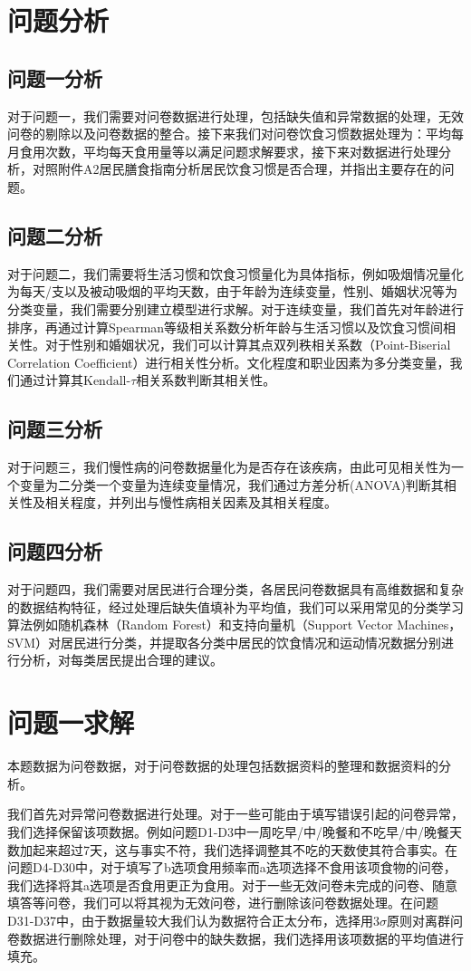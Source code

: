 \documentclass{cumcmthesis}
\begin{document}
\section{问题分析}

\subsection{问题一分析}
对于问题一，我们需要对问卷数据进行处理，包括缺失值和异常数据的处理，无效问卷的剔除以及问卷数据的整合。接下来我们对问卷饮食习惯数据处理为：平均每月食用次数，平均每天食用量等以满足问题求解要求，接下来对数据进行处理分析，对照附件A2居民膳食指南分析居民饮食习惯是否合理，并指出主要存在的问题。
\subsection{问题二分析}
对于问题二，我们需要将生活习惯和饮食习惯量化为具体指标，例如吸烟情况量化为每天/支以及被动吸烟的平均天数，由于年龄为连续变量，性别、婚姻状况等为分类变量，我们需要分别建立模型进行求解。对于连续变量，我们首先对年龄进行排序，再通过计算Spearman等级相关系数分析年龄与生活习惯以及饮食习惯间相关性。对于性别和婚姻状况，我们可以计算其点双列秩相关系数（Point-Biserial Correlation Coefficient）进行相关性分析。文化程度和职业因素为多分类变量，我们通过计算其$\text{Kendall-}\tau$相关系数判断其相关性。
\subsection{问题三分析}
对于问题三，我们慢性病的问卷数据量化为是否存在该疾病，由此可见相关性为一个变量为二分类一个变量为连续变量情况，我们通过方差分析(ANOVA)判断其相关性及相关程度，并列出与慢性病相关因素及其相关程度。
\subsection{问题四分析}
对于问题四，我们需要对居民进行合理分类，各居民问卷数据具有高维数据和复杂的数据结构特征，经过处理后缺失值填补为平均值，我们可以采用常见的分类学习算法例如随机森林（Random Forest）和支持向量机（Support Vector Machines，SVM）对居民进行分类，并提取各分类中居民的饮食情况和运动情况数据分别进行分析，对每类居民提出合理的建议。
\section{问题一求解}
本题数据为问卷数据，对于问卷数据的处理包括数据资料的整理和数据资料的分析。

我们首先对异常问卷数据进行处理。对于一些可能由于填写错误引起的问卷异常，我们选择保留该项数据。例如问题D1-D3中一周吃早/中/晚餐和不吃早/中/晚餐天数加起来超过7天，这与事实不符，我们选择调整其不吃的天数使其符合事实。在问题D4-D30中，对于填写了b选项食用频率而a选项选择不食用该项食物的问卷，我们选择将其a选项是否食用更正为食用。对于一些无效问卷未完成的问卷、随意填答等问卷，我们可以将其视为无效问卷，进行删除该问卷数据处理。在问题D31-D37中，由于数据量较大我们认为数据符合正太分布，选择用$3\sigma$原则对离群问卷数据进行删除处理，对于问卷中的缺失数据，我们选择用该项数据的平均值进行填充。
\end{document}
